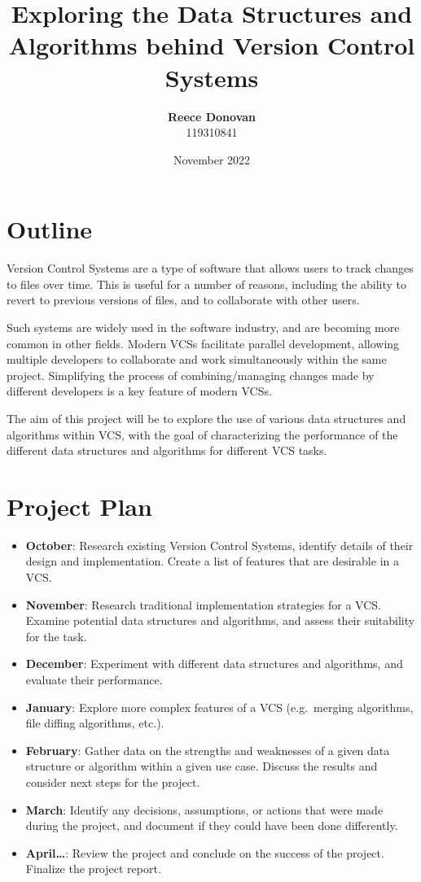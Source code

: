 \documentclass[a4paper,12pt]{article}
\begin{document}
\title{Exploring the Data Structures and Algorithms behind Version Control Systems}
\date{November 2022}
\author{\textbf{Reece Donovan}
    \\
    \small{119310841}
}
\maketitle
\thispagestyle{empty}
\section*{Outline}
Version Control Systems are a type of software that allows users to track changes to files over time\@. This is useful for a number of reasons, including the ability to revert to previous versions of files, and to collaborate with other users\cite{zolkifli_ngah_deraman_2018}.

Such systems are widely used in the software industry, and are becoming more common in other fields\@. Modern VCSs facilitate parallel development, allowing multiple developers to collaborate and work simultaneously within the same project\@. Simplifying the process of combining/managing changes made by different developers is a key feature of modern VCSs\@.

The aim of this project will be to explore the use of various data structures and algorithms within VCS, with the goal of characterizing the performance of the different data structures and algorithms for different VCS tasks\@. 


\section*{Project Plan}
\begin{itemize}
    \item \textbf{October}: Research existing Version Control Systems, identify details of their design and implementation. Create a list of features that are desirable in a VCS\@.
    \item \textbf{November}: Research traditional implementation strategies for a VCS\@. Examine potential data structures and algorithms, and assess their suitability for the task\@.
    \item \textbf{December}: Experiment with different data structures and algorithms, and evaluate their performance\@.
    \item \textbf{January}: Explore more complex features of a VCS (e.g.\ merging algorithms, file diffing algorithms, etc.).
    \item \textbf{February}: Gather data on the strengths and weaknesses of a given data structure or algorithm within a given use case. Discuss the results and consider next steps for the project.
    \item \textbf{March}: Identify any decisions, assumptions, or actions that were made during the project, and document if they could have been done differently.
    \item \textbf{April\ldots}: Review the project and conclude on the success of the project. Finalize the project report.
\end{itemize}



\end{document}
